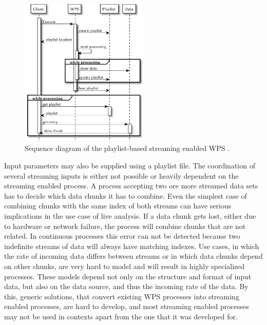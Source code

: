 	\begin{figure}[!htb]
		\centering
		\includegraphics[width=0.54225352112676062\textwidth]{figures/sequence-diagramm-previous.pdf}
		\caption{\label{fig:sd:previous}Sequence diagram of the playlist-based streaming enabled WPS \citep{foerster2012live}.}
	\end{figure}

	Input parameters may also be supplied using a playlist file. The coordination of several streaming inputs is either not possible or heavily dependent on the streaming enabled process. A process accepting two ore more streamed data sets has to decide which data chunks it has to combine. Even the simplest case of combining chunks with the same index of both streams can have serious implications in the use case of live analysis. If a data chunk gets lost, either due to hardware or network failure, the process will combine chunks that are not related. In continuous processes this error can not be detected because two indefinite streams of data will always have matching indexes. Use cases, in which the rate of incoming data differs between streams or in which data chunks depend on other chunks, are very hard to model and will result in highly specialized processes. These models depend not only on the structure and format of input data, but also on the data source, and thus the incoming rate of the data. By this, generic solutions, that convert existing \ac{WPS} processes into streaming enabled processes, are hard to develop, and most streaming enabled processes may not be used in contexts apart from the one that it was developed for.

